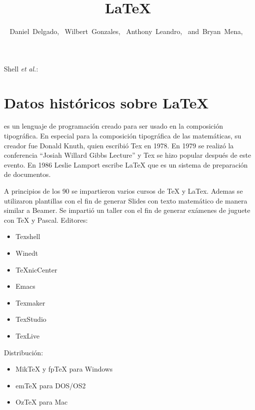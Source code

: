 \documentclass[10pt,journal,compsoc]{IEEEtran}
\begin{document}
\title{\LaTeX}

\author{Daniel~Delgado,~
        Wilbert~Gonzales,~
        Anthony~Leandro,~
        and~Bryan~Mena,~
}
{Shell \MakeLowercase{\textit{et al.}}: \LaTex}

\maketitle

\IEEEdisplaynontitleabstractindextext

\IEEEpeerreviewmaketitle

\section{Datos hist\'oricos sobre LaTeX}
 es un lenguaje de programaci\'on creado para ser usado en la composici\'on tipogr\'afica. En especial para la composici\'on tipogr\'afica de las matem\'aticas, su creador fue Donald Knuth, quien escribi\'o Tex en 1978.
En 1979 se realiz\'o la conferencia “Josiah Willard Gibbs Lecture” y Tex se hizo popular despu\'es de este evento.
En 1986 Leslie Lamport escribe LaTeX que es un sistema de preparaci\'on de documentos.

A principios de los 90 se impartieron varios cursos de TeX y LaTex. Ademas se utilizaron plantillas con el fin de generar Slides con texto matem\'atico de manera similar a Beamer.
Se imparti\'o un taller con el fin de generar ex\'amenes de juguete con TeX y Pascal.
Editores:
\begin{itemize}
	\item Texshell
	\item Winedt
	\item TeXnicCenter
	\item Emacs
	\item Texmaker
	\item TexStudio
	\item TexLive
\end{itemize}
Distribuci\'on:
\begin{itemize}
	\item MikTeX y fpTeX para Windows
	\item emTeX para DOS/OS2
	\item OzTeX para Mac
\end{itemize}
\end{document}
